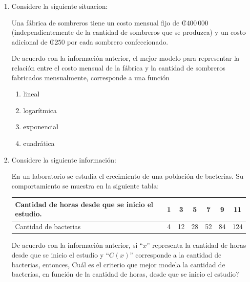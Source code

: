 \documentclass[12pt]{article}
\begin{document}
\begin{enumerate}[label=\textbf{\arabic*.}, itemsep=2.5cm]
\begin{enumerate}[label=\Alph*)]
  \item $h(x) = 5^{x}$
  \item $h(x) = 5x^{2}$
  \item $h(x) = \log_{\tfrac{1}{5}}(x)$
  \item $h(x) = 5x$
\end{enumerate}

\Needspace{0.42\textheight}
\item
Considere la siguiente situacion:

Una f\'abrica de sombreros tiene un costo mensual fijo de \mbox{₡$400\,000$} (independientemente de la cantidad de sombreros que se produzca) y un costo adicional de \mbox{₡$250$} por cada sombrero confeccionado.

De acuerdo con la informaci\'on anterior, el mejor modelo para representar la relaci\'on entre el costo mensual de la f\'abrica y la cantidad de sombreros fabricados mensualmente, corresponde a una funci\'on

\begin{enumerate}[label=\Alph*)]
  \item lineal
  \item logar\'itmica
  \item exponencial
  \item cuadr\'atica
\end{enumerate}

\Needspace{0.62\textheight}
\item
Considere la siguiente informaci\'on:

En un laboratorio se estudia el crecimiento de una poblaci\'on de bacterias. Su comportamiento se muestra en la siguiente tabla:

\begin{center}
\begin{tabular}{|p{5.5cm}|c|c|c|c|c|c|}
\hline
Cantidad de horas desde que se inicio el estudio. & 1 & 3 & 5 & 7 & 9 & 11 \\
\hline
Cantidad de bacterias & 4 & 12 & 28 & 52 & 84 & 124 \\
\hline
\end{tabular}
\end{center}

De acuerdo con la informaci\'on anterior, si ``$x$'' representa la cantidad de horas desde que se inicio el estudio y ``$C(x)$'' corresponde a la cantidad de bacterias, entonces, \textquestiondown Cu\'al es el criterio que mejor modela la cantidad de bacterias, en funci\'on de la cantidad de horas, desde que se inicio el estudio?


\end{enumerate}
\end{document}

